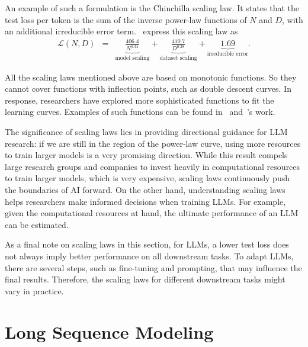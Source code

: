 An example of such a formulation is the Chinchilla scaling law. It states that the test loss per token is the sum of the inverse power-law functions of $N$ and $D$, with an additional irreducible error term.~\citet{hoffmann-etal:2022training} express this scaling law as
\begin{eqnarray}
\mathcal{L}(N,D) & = & \underbrace{\frac{406.4}{N^{0.34}}}_{\textrm{model scaling}} + \underbrace{\frac{410.7}{D^{0.28}}}_{\textrm{dataset scaling}} + \underbrace{1.69}_{\textrm{irreducible error}}.
\end{eqnarray}

All the scaling laws mentioned above are based on monotonic functions. So they cannot cover functions with inflection points, such as double descent curves. In response, researchers have explored more sophisticated functions to fit the learning curves. Examples of such functions can be found in~\citet{alabdulmohsin-etal:2022revisiting} and~\citet{caballero-etal:2023broken}'s work.

The significance of scaling laws lies in providing directional guidance for LLM research: if we are still in the region of the power-law curve, using more resources to train larger models is a very promising direction. While this result compels large research groups and companies to invest heavily in computational resources to train larger models, which is very expensive, scaling laws continuously push the boundaries of AI forward. On the other hand, understanding scaling laws helps researchers make informed decisions when training LLMs. For example, given the computational resources at hand, the ultimate performance of an LLM can be estimated.

As a final note on scaling laws in this section, for LLMs, a lower test loss does not always imply better performance on all downstream tasks. To adapt LLMs, there are several steps, such as fine-tuning and prompting, that may influence the final results. Therefore, the scaling laws for different downstream tasks might vary in practice.


\section{Long Sequence Modeling}
\label{sec:long-sequence-modeling}

